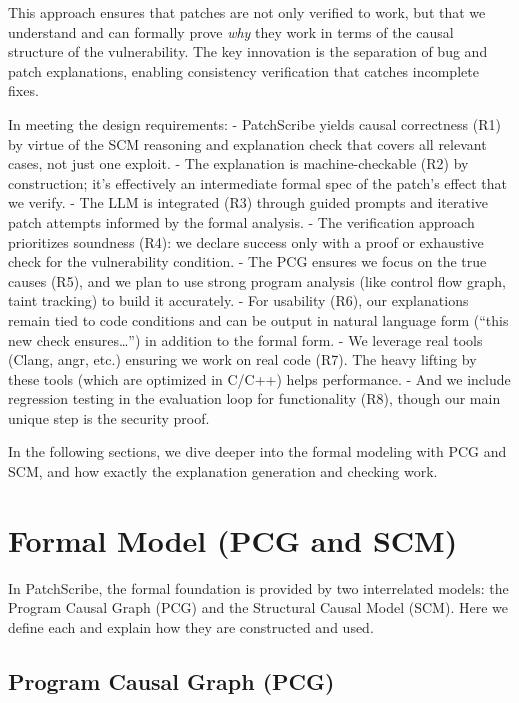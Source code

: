 \documentclass[conference,compsoc]{IEEEtran}
\begin{document}
This approach ensures that patches are not only verified to work, but
that we understand and can formally prove \emph{why} they work in terms
of the causal structure of the vulnerability. The key innovation is the
separation of bug and patch explanations, enabling consistency
verification that catches incomplete fixes.

In meeting the design requirements: - PatchScribe yields causal
correctness (R1) by virtue of the SCM reasoning and explanation check
that covers all relevant cases, not just one exploit. - The explanation
is machine-checkable (R2) by construction; it's effectively an
intermediate formal spec of the patch's effect that we verify. - The LLM
is integrated (R3) through guided prompts and iterative patch attempts
informed by the formal analysis. - The verification approach prioritizes
soundness (R4): we declare success only with a proof or exhaustive check
for the vulnerability condition. - The PCG ensures we focus on the true
causes (R5), and we plan to use strong program analysis (like control
flow graph, taint tracking) to build it accurately. - For usability
(R6), our explanations remain tied to code conditions and can be output
in natural language form (``this new check ensures\ldots'') in addition
to the formal form. - We leverage real tools (Clang, angr, etc.)
ensuring we work on real code (R7). The heavy lifting by these tools
(which are optimized in C/C++) helps performance. - And we include
regression testing in the evaluation loop for functionality (R8), though
our main unique step is the security proof.

In the following sections, we dive deeper into the formal modeling with
PCG and SCM, and how exactly the explanation generation and checking
work.

\section{Formal Model (PCG and SCM)}\label{formal-model-pcg-and-scm}

In PatchScribe, the formal foundation is provided by two interrelated
models: the Program Causal Graph (PCG) and the Structural Causal Model
(SCM). Here we define each and explain how they are constructed and
used.

\subsection{Program Causal Graph (PCG)}\label{program-causal-graph-pcg}
\end{document}
